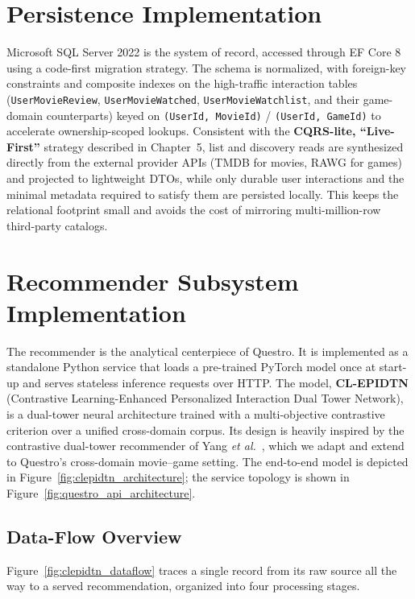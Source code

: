 \section{Persistence Implementation}
Microsoft SQL Server 2022 is the system of record, accessed through EF Core 8 using a code-first migration strategy. The schema is normalized, with foreign-key constraints and composite indexes on the high-traffic interaction tables (\texttt{UserMovieReview}, \texttt{UserMovieWatched}, \texttt{UserMovieWatchlist}, and their game-domain counterparts) keyed on \texttt{(UserId, MovieId)} / \texttt{(UserId, GameId)} to accelerate ownership-scoped lookups. Consistent with the \textbf{CQRS-lite, ``Live-First''} strategy described in Chapter~5, list and discovery reads are synthesized directly from the external provider APIs (TMDB \cite{tmdb_ref} for movies, RAWG \cite{rawg_site} for games) and projected to lightweight DTOs, while only durable user interactions and the minimal metadata required to satisfy them are persisted locally. This keeps the relational footprint small and avoids the cost of mirroring multi-million-row third-party catalogs.

\section{Recommender Subsystem Implementation}
\label{sec:recommender_impl}
The recommender is the analytical centerpiece of Questro. It is implemented as a standalone Python service that loads a pre-trained PyTorch model once at start-up and serves stateless inference requests over HTTP. The model, \textbf{CL-EPIDTN} (Contrastive Learning-Enhanced Personalized Interaction Dual Tower Network), is a dual-tower neural architecture trained with a multi-objective contrastive criterion over a unified cross-domain corpus. Its design is heavily inspired by the contrastive dual-tower recommender of Yang \textit{et al.}~\cite{yang2025clepidtn}, which we adapt and extend to Questro's cross-domain movie--game setting. The end-to-end model is depicted in Figure~\ref{fig:clepidtn_architecture}; the service topology is shown in Figure~\ref{fig:questro_api_architecture}.

\subsection{Data-Flow Overview}
\label{sec:clepidtn_dataflow_sec}
Figure~\ref{fig:clepidtn_dataflow} traces a single record from its raw source all the way to a served recommendation, organized into four processing stages.

